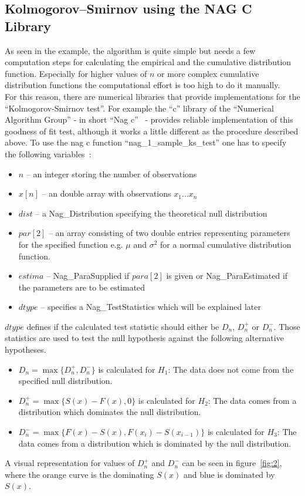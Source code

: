 \documentclass{article}
\begin{document}
\subsection{Kolmogorov–Smirnov using the NAG C Library}
As seen in the example, the algorithm is quite simple but needs a few computation steps for calculating the empirical and the cumulative distribution function.
Especially for higher values of $n$ or more complex cumulative distribution functions the computational effort is too high to do it manually.\\
For this reason, there are numerical libraries that provide implementations for the ``Kolmogorov-Smirnov test''. For example the ``c'' library of the ``Numerical Algorithm Group'' - in short ``Nag c''~\cite{nagc} - provides reliable implementation of this goodness of fit test, although it works a little different as the procedure described above.
To use the nag c function ``nag\_1\_sample\_ks\_test'' one has to specify the following variables~\cite{nagcKS}:
\begin{itemize}
\item $n$ -- an integer storing the number of observations
\item $x[n]$ -- an double array with observations $x_1 … x_n$
\item $dist$ -- a Nag\_Distribution specifying the theoretical null distribution
\item $par[2]$ -- an array consisting of two double entries representing parameters for the specified function e.g. $\mu$ and $\sigma^2$ for a normal cumulative distribution function.
\item $estima$ -- Nag\_ParaSupplied if $para[2]$ is given or Nag\_ParaEstimated if the parameters are to be estimated
\item $dtype$ -- specifies a Nag\_TestStatistics which will be explained later
\end{itemize}
$dtype$ defines if the calculated test statistic should either be $D_n$, $D^+_n$ or $D^-_n$.
Those statistics are used to test the null hypothesis against the following alternative hypotheses.
\begin{itemize}
\item $D_n=\max\{D^+_n,D^-_n\}$ is calculated for $H_1 $: The data does not come from the specified null distribution.\\
\item $D^+_n=\max\{S(x)-F(x),0\}$ is calculated for $H_2$: The data comes from a distribution which dominates the null distribution.\\
\item $D^-_n=\max\{F(x)-S(x),F(x_i)-S(x_{i-1})\}$ is calculated for $H_3$: The data comes from a distribution which is dominated by the null distribution.\\
\end{itemize}
A visual representation for values of $D_n^+$ and $D_n^-$ can be seen in figure~\ref{fig:2}, where the orange curve is the dominating $S(x)$ and blue is dominated by $S(x)$.
\end{document}

